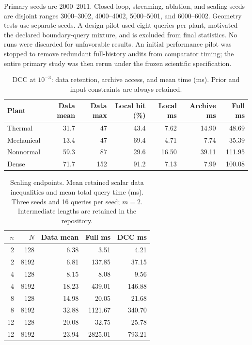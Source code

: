 Primary seeds are 2000--2011. Closed-loop, streaming, ablation, and scaling seeds are disjoint ranges 3000--3002, 4000--4002, 5000--5001, and 6000--6002. Geometry tests use separate seeds. A design pilot used eight queries per plant, motivated the declared boundary-query mixture, and is excluded from final statistics. No runs were discarded for unfavorable results. An initial performance pilot was stopped to remove redundant full-history audits from comparator timing; the entire primary study was then rerun under the frozen scientific specification.

\begin{table}[ht]\centering
\caption{DCC at $10^{-3}$: data retention, archive access, and mean time (ms). Prior and input constraints are always retained.}\label{tab:timing}
\setlength{\tabcolsep}{5pt}
\begin{tabular}{lrrrrrr}\toprule
Plant & Data mean & Data max & Local hit (\%) & Local ms & Archive ms & Full ms\\\midrule
Thermal &31.7&47&43.4&7.62&14.90&48.69\\
Mechanical &13.4&47&69.4&4.71&7.74&35.39\\
Nonnormal &59.3&87&29.6&16.50&39.11&111.95\\
Dense &71.7&152&91.2&7.13&7.99&100.08\\\bottomrule\end{tabular}\end{table}

\begin{table}[ht]\centering
\caption{Scaling endpoints. Mean retained scalar data inequalities and mean total query time (ms). Three seeds and 16 queries per seed; $m=2$. Intermediate lengths are retained in the repository.}\label{tab:scaling}
\begin{tabular}{rrrrr}\toprule
$n$ & $N$ & Data mean & Full ms & DCC ms\\\midrule
2&128&6.38&3.51&4.21\\2&8192&6.81&137.85&37.15\\
4&128&8.15&8.08&9.56\\4&8192&18.23&439.01&146.88\\
8&128&14.98&20.05&21.68\\8&8192&32.88&1121.67&340.70\\
12&128&20.08&32.75&25.78\\12&8192&23.94&2825.01&793.21\\\bottomrule\end{tabular}\end{table}

